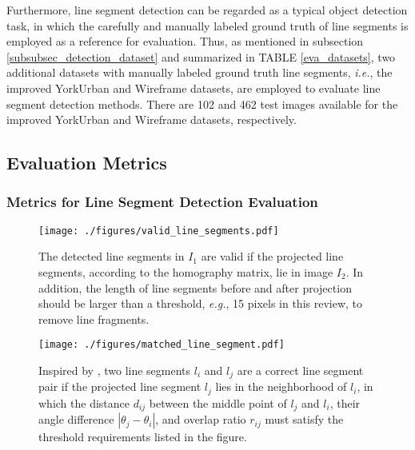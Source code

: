\documentclass[journal,compsoc]{IEEEtran}
\begin{document}
Furthermore, line segment detection can be regarded as a typical object detection task, in which the carefully and manually labeled ground truth of line segments is employed as a reference for evaluation. Thus, as mentioned in subsection \ref{subsubsec_detection_dataset} and summarized in TABLE \ref{eva_datasets}, two additional datasets with manually labeled ground truth line segments, \textit{i.e.}, the improved YorkUrban \cite{ANovelLineletBasedRepresentationforLineSegmentDetection} and Wireframe \cite{LearningtoParseWireframesinImagesofMan-MadeEnvironments} datasets, are employed to evaluate line segment detection methods. There are 102 and 462 test images available for the improved YorkUrban and Wireframe datasets, respectively.


\subsection{Evaluation Metrics}
\label{subsec_performance_metric}
\subsubsection{Metrics for Line Segment Detection Evaluation}

\begin{figure}[tbp]
	\centering
	\texttt{[image: ./figures/valid\_line\_segments.pdf]}
	\caption{The detected line segments in $I_1$ are valid if the projected line segments, according to the homography matrix, lie in image $I_2$. In addition, the length of line segments before and after projection should be larger than a threshold, \textit{e.g.}, 15 pixels in this review, to remove line fragments.}
	\label{valid_line_segments}
\end{figure}

\begin{figure}[tbp]
	\centering
	\texttt{[image: ./figures/matched\_line\_segment.pdf]}
	\caption{Inspired by \cite{ANovelLineletBasedRepresentationforLineSegmentDetection}, two line segments $l_i$ and $l_j$ are a correct line segment pair if the projected line segment $l_j$ lies in the neighborhood of $l_i$, in which the distance $d_{ij}$ between the middle point of $l_j$ and $l_i$, their angle difference $|\theta_j-\theta_i|$, and overlap ratio $r_{ij}$ must satisfy the threshold requirements listed in the figure.}
	\label{matched_line_segment}
\end{figure}
\end{document}
